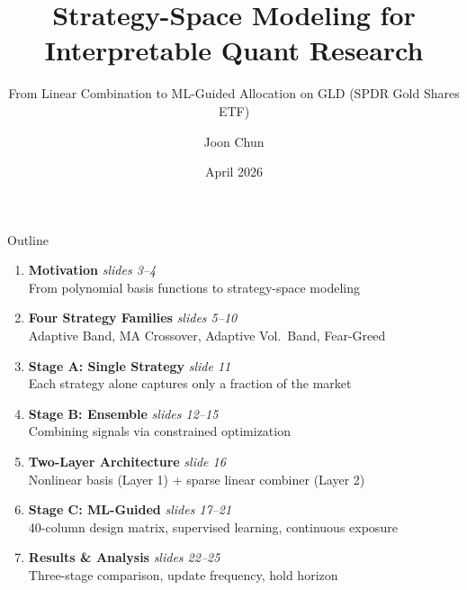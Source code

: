\documentclass[aspectratio=169]{beamer}
\title{Strategy-Space Modeling for Interpretable Quant Research}
\subtitle{From Linear Combination to ML-Guided Allocation on GLD (SPDR Gold Shares ETF)}
\author{Joon Chun}
\date{April 2026}
\begin{document}
\begin{frame}
  \titlepage
\end{frame}

\begin{frame}{Outline}
  \begin{enumerate}
    \item \textbf{Motivation} \hfill \small\textit{slides 3--4}\\[-0.1em]
      \footnotesize From polynomial basis functions to strategy-space modeling
    \normalsize\vspace{0.3em}

    \item \textbf{Four Strategy Families} \hfill \small\textit{slides 5--10}\\[-0.1em]
      \footnotesize Adaptive Band, MA Crossover, Adaptive Vol.\ Band, Fear-Greed
    \normalsize\vspace{0.3em}

    \item \textbf{Stage A: Single Strategy} \hfill \small\textit{slide 11}\\[-0.1em]
      \footnotesize Each strategy alone captures only a fraction of the market
    \normalsize\vspace{0.3em}

    \item \textbf{Stage B: Ensemble} \hfill \small\textit{slides 12--15}\\[-0.1em]
      \footnotesize Combining signals via constrained optimization
    \normalsize\vspace{0.3em}

    \item \textbf{Two-Layer Architecture} \hfill \small\textit{slide 16}\\[-0.1em]
      \footnotesize Nonlinear basis (Layer 1) + sparse linear combiner (Layer 2)
    \normalsize\vspace{0.3em}

    \item \textbf{Stage C: ML-Guided} \hfill \small\textit{slides 17--21}\\[-0.1em]
      \footnotesize 40-column design matrix, supervised learning, continuous exposure
    \normalsize\vspace{0.3em}

    \item \textbf{Results \& Analysis} \hfill \small\textit{slides 22--25}\\[-0.1em]
      \footnotesize Three-stage comparison, update frequency, hold horizon
    \normalsize\vspace{0.3em}


\end{enumerate}
\end{frame}
\end{document}
